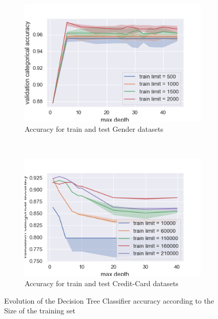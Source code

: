 \documentclass[10pt]{article}
\begin{document}
		\begin{figure}[]
			\centering
			\begin{subfigure}[]{0.45\columnwidth}
				\centering
				\includegraphics[width=\linewidth]{../graphics/tree_gender_max_depth_score_type_train_limit.png}
				\caption{Accuracy for train and test Gender datasets}
				\label{tree:gender_train_size_score_type_score_type}
			\end{subfigure}
			~
			\begin{subfigure}[]{0.45\columnwidth}
				\centering
				\includegraphics[width=\linewidth]{../graphics/tree_creditcard_max_depth_score_type_train_limit.png}
				\caption{Accuracy for train and test Credit-Card datasets}
				\label{tree:creditcard_train_size_score_type_score_type}
			\end{subfigure}
			\caption{Evolution of the Decision Tree Classifier accuracy according to the Size of the training set}
			\label{tree:train_size_score_type_score_type}
		\end{figure}
\end{document}
